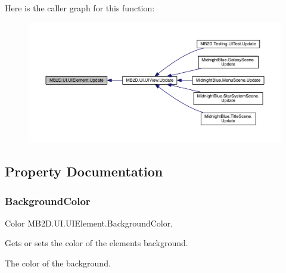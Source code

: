 Here is the caller graph for this function\+:\nopagebreak
\begin{figure}[H]
\begin{center}
\leavevmode
\includegraphics[width=350pt]{class_m_b2_d_1_1_u_i_1_1_u_i_element_aa97bcbe44f3fac8a13e2febca23b2d4d_icgraph}
\end{center}
\end{figure}


\subsection{Property Documentation}
\hypertarget{class_m_b2_d_1_1_u_i_1_1_u_i_element_abcd3eabd4db0998955a1e856a41d3d84}{}\label{class_m_b2_d_1_1_u_i_1_1_u_i_element_abcd3eabd4db0998955a1e856a41d3d84} 
\subsubsection{\texorpdfstring{Background\+Color}{BackgroundColor}}
{\footnotesize\ttfamily Color M\+B2\+D.\+U\+I.\+U\+I\+Element.\+Background\+Color\hspace{0.3cm}{\ttfamily [get]}, {\ttfamily [set]}}



Gets or sets the color of the elements background. 

The color of the background.\hypertarget{class_m_b2_d_1_1_u_i_1_1_u_i_element_af5fa3d6d3757bfe0a8d5ddd03d897c6c}{}\label{class_m_b2_d_1_1_u_i_1_1_u_i_element_af5fa3d6d3757bfe0a8d5ddd03d897c6c} 
